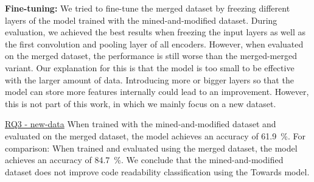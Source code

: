 \documentclass[%
class=scrreprt,
chapterprefix=false,%
open=right,%
twoside=true,%
paper=a4,%
logofile={Logo\_zentral\_farbig\_EN.png},%
thesistype=master,%
UKenglish,%
]{se2thesis}
\theoremstyle{definition}
\begin{document}
	\textbf{Fine-tuning:}
	We tried to fine-tune the merged dataset by freezing different layers of the model trained with the mined-and-modified dataset. During evaluation, we achieved the best results when freezing the input layers as well as the first convolution and pooling layer of all encoders. 
	However, when evaluated on the merged dataset, the performance is still worse than the merged-merged variant.
	Our explanation for this is that the model is too small to be effective with the larger amount of data. Introducing more or bigger layers so that the model can store more features internally could lead to an improvement. However, this is not part of this work, in which we mainly focus on a new dataset.
	
	\begin{summary}{\hyperref[new-data]{RQ3 - new-data}}
		When trained with the mined-and-modified dataset and evaluated on the merged dataset, the model achieves an accuracy of 61.9~\%. For comparison: When trained and evaluated using the merged dataset, the model achieves an accuracy of 84.7~\%.
		We conclude that the mined-and-modified dataset does not improve code readability classification using the Towards model.
	\end{summary}
	
	
\end{document}
